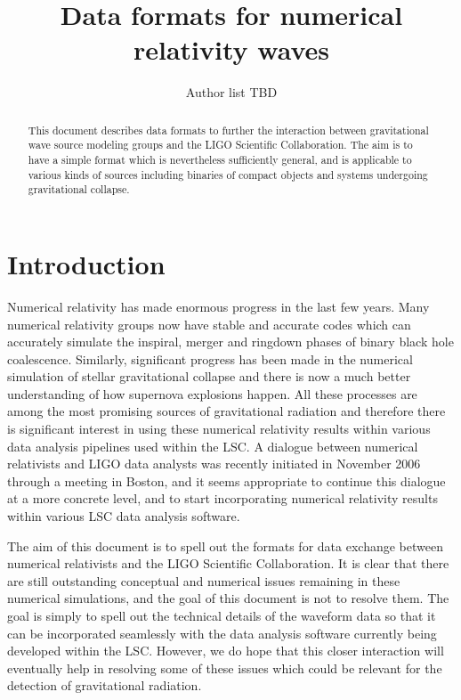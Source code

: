 \documentclass{article}
\title{Data formats for numerical relativity waves}
\date{\RCSDate}
\author{Author list TBD}
\numberwithin{equation}{section}
\begin{document}
\maketitle

\begin{abstract}
  This document describes data formats to further the interaction
  between gravitational wave source modeling groups and the LIGO
  Scientific Collaboration. The aim is to have a simple format which
  is nevertheless sufficiently general, and is applicable to various
  kinds of sources including binaries of compact objects and systems
  undergoing gravitational collapse.
\end{abstract}

\section{Introduction}
\label{sec:intro}

Numerical relativity has made enormous progress in the last few years.
Many numerical relativity groups now have stable and accurate codes
which can accurately simulate the inspiral, merger and ringdown phases
of binary black hole coalescence.  Similarly, significant progress has
been made in the numerical simulation of stellar gravitational
collapse and there is now a much better understanding of how supernova
explosions happen.  All these processes are among the most promising
sources of gravitational radiation and therefore there is significant
interest in using these numerical relativity results within various
data analysis pipelines used within the LSC.  A dialogue between
numerical relativists and LIGO data analysts was recently initiated in
November 2006 through a meeting in Boston, and it seems appropriate to
continue this dialogue at a more concrete level, and to start
incorporating numerical relativity results within various LSC data
analysis software. 

The aim of this document is to spell out the formats for data exchange
between numerical relativists and the LIGO Scientific Collaboration.
It is clear that there are still outstanding conceptual and numerical
issues remaining in these numerical simulations, and the goal of this
document is not to resolve them.  The goal is simply to spell out the
technical details of the waveform data so that it can be incorporated
seamlessly with the data analysis software currently being developed
within the LSC.  However, we do hope that this closer interaction will
eventually help in resolving some of these issues which could be
relevant for the detection of gravitational radiation.  
\end{document}
